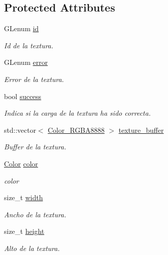 \subsection*{Protected Attributes}
\begin{DoxyCompactItemize}
\item 
G\+Lenum \mbox{\hyperlink{classexample_1_1_texture_a0552b2332a4f37a2ea65330d1795ba71}{id}}
\begin{DoxyCompactList}\small\item\em Id de la textura. \end{DoxyCompactList}\item 
G\+Lenum \mbox{\hyperlink{classexample_1_1_texture_aa0d052f1c7feb5a4ca4a739d260b0046}{error}}
\begin{DoxyCompactList}\small\item\em Error de la textura. \end{DoxyCompactList}\item 
bool \mbox{\hyperlink{classexample_1_1_texture_a6b7f4fa04a6952de06b7496116df64ff}{success}}
\begin{DoxyCompactList}\small\item\em Indica si la carga de la textura ha sido correcta. \end{DoxyCompactList}\item 
std\+::vector$<$ \mbox{\hyperlink{classexample_1_1_color___r_g_b_a8888}{Color\+\_\+\+R\+G\+B\+A8888}} $>$ \mbox{\hyperlink{classexample_1_1_texture_ade1ae471d0d7d67854d6924f502a485c}{texture\+\_\+buffer}}
\begin{DoxyCompactList}\small\item\em Buffer de la textura. \end{DoxyCompactList}\item 
\mbox{\hyperlink{classexample_1_1_color___r_g_b_a8888}{Color}} \mbox{\hyperlink{classexample_1_1_texture_ad3ef14f36cf972a324055063cd452dc4}{color}}
\begin{DoxyCompactList}\small\item\em color \end{DoxyCompactList}\item 
size\+\_\+t \mbox{\hyperlink{classexample_1_1_texture_a7145084592702dbfc07a914186a9bfd5}{width}}
\begin{DoxyCompactList}\small\item\em Ancho de la textura. \end{DoxyCompactList}\item 
size\+\_\+t \mbox{\hyperlink{classexample_1_1_texture_a5d5d9fca80c49b9b7c5c5c8adaf0f360}{height}}
\begin{DoxyCompactList}\small\item\em Alto de la textura. \end{DoxyCompactList}\end{DoxyCompactItemize}



